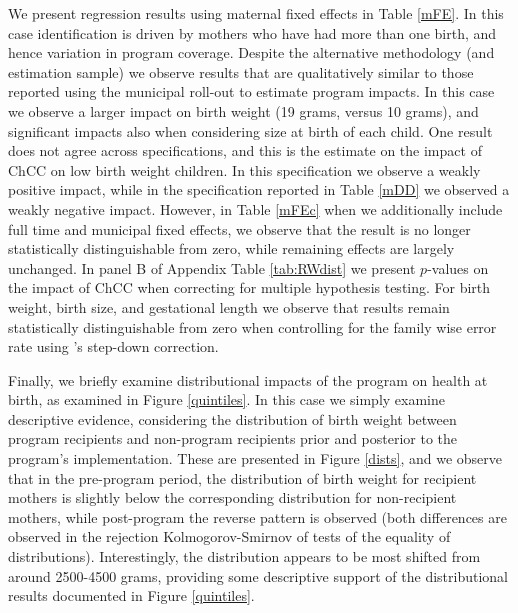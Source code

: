 \documentclass[12pt]{article}
\begin{document}
\begin{spacing}{1.4}
We present regression results using maternal fixed effects in Table
\ref{mFE}.  In this case identification is driven by mothers who have
had more than one birth, and hence variation in program coverage.
Despite the alternative methodology (and estimation sample) we observe
results that are qualitatively similar to those reported using the
municipal roll-out to estimate program impacts. In this case we observe
a larger impact on birth weight (19 grams, versus 10 grams), and
significant impacts also when considering size at birth of each child.
One result does not agree across specifications, and this is the
estimate on the impact of ChCC on low birth weight children.
In this specification we observe a weakly positive impact, while
in the specification reported in Table \ref{mDD} we observed a
weakly negative impact.  However, in Table \ref{mFEc} when we additionally
include full time and municipal fixed effects, we observe that the
result is no longer statistically distinguishable from zero, while
remaining effects are largely unchanged.  In panel B of Appendix Table
\ref{tab:RWdist} we present $p$-values on the impact of ChCC when
correcting for multiple hypothesis testing.  For birth weight, birth
size, and gestational length we observe that results remain statistically
distinguishable from zero when controlling for the family wise error
rate using \citeauthor{RomanoWolf2005}'s step-down correction.





Finally, we briefly examine distributional impacts of the program
on health at birth, as examined in Figure \ref{quintiles}.  In this
case we simply examine descriptive evidence, considering the
distribution of birth weight between program recipients and
non-program recipients prior and posterior to the program's
implementation.  These are presented in Figure \ref{dists}, and
we observe that in the pre-program period, the distribution of birth
weight for recipient mothers is slightly below the corresponding
distribution for non-recipient mothers, while post-program the
reverse pattern is observed (both differences are observed in
the rejection Kolmogorov-Smirnov of tests of the equality of
distributions).  Interestingly, the distribution appears to be
most shifted from around 2500-4500 grams, providing some descriptive
support of the distributional results documented in Figure
\ref{quintiles}.



\end{spacing}
\end{document}
